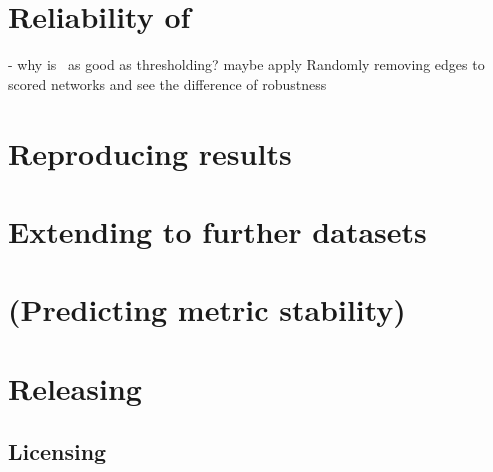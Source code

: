 \section{Reliability of \graffs}

- why is~ as good as thresholding?
maybe apply Randomly removing edges to scored networks and see the difference of robustness


\section{Reproducing results}


\section{Extending to further datasets}


\section{(Predicting metric stability)}


\section{Releasing \graffs}
\subsection{Licensing}

